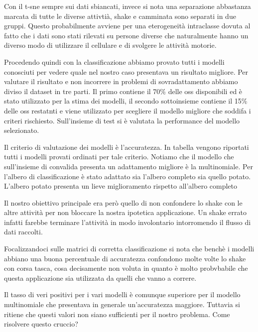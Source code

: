 \documentclass{report}
\begin{document}
%
Con il t-sne sempre sui dati sbiancati, invece si nota una separazione abbastanza marcata di tutte le diverse attivtià, shake e camminata sono separati in due gruppi. Questo probabilmente avviene per una eterogeneità intraclasse dovuta al fatto che i dati sono stati rilevati su persone diverse che naturalmente hanno un diverso modo di utilizzare il cellulare e di svolgere le attività motorie. 
%

%
Procedendo quindi con la classificazione abbiamo provato tutti i modelli conosciuti per vedere quale nel nostro caso presentava un risultato migliore. Per valutare il risultato e non incorrere in problemi di sovradattamento abbiamo diviso il dataset in tre parti. Il primo contiene il 70\% delle oss disponibili ed è stato utilizzato per la stima dei modelli, il secondo sottoinsieme contiene il 15\% delle oss restatnti e viene utilizzato per scegliere il modello migliore che soddifa  i criteri rischiesto. Sull'insieme di test si è valutata la performance del modello selezionato. 
%

%
Il criterio di valutazione dei modelli è l'accuratezza. In tabella vengono riportati tutti i modelli provati ordinati per tale criterio. Notiamo che il modello che sull'insieme di convalida presenta un adattamento migliore è la multinomiale. Per l'albero di classificazione è stato adattato sia l'albero completo sia quello potato. L'albero potato presenta un lieve miglioramento rispetto all'albero completo
%

%
Il nostro obiettivo principale era però quello di non confondere lo shake con le altre attività per non bloccare la nostra ipotetica applicazione. Un shake errato infatti farebbe terminare l\rq{}attività in modo involontario intorromendo il flusso di dati raccolti.
%

%
Focalizzandoci sulle matrici di corretta classificazione si nota che benchè i modelli abbiano una buona percentuale di accuratezza confondono molte volte lo shake con corsa tasca, cosa decisamente non voluta in quanto è molto probvbabile che questa applicazione sia utilizzata da quelli che vanno a correre. 
%

%
Il tasso di veri positivi per i vari modelli è comunque superiore per il modello multinomiale che presentava in generale un'accuratezza maggiore. Tuttavia si ritiene che questi valori non siano sufficienti per il nostro problema. Come risolvere questo cruccio?
%
\end{document}

